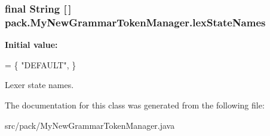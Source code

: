\subsubsection[{\texorpdfstring{lex\+State\+Names}{lexStateNames}}]{\setlength{\rightskip}{0pt plus 5cm}final String \mbox{[}$\,$\mbox{]} pack.\+My\+New\+Grammar\+Token\+Manager.\+lex\+State\+Names\hspace{0.3cm}{\ttfamily [static]}}\hypertarget{classpack_1_1_my_new_grammar_token_manager_a46273aab1da1108eab37e3c575573615}{}\label{classpack_1_1_my_new_grammar_token_manager_a46273aab1da1108eab37e3c575573615}
{\bfseries Initial value\+:}
\begin{DoxyCode}
= \{
   \textcolor{stringliteral}{"DEFAULT"},
\}
\end{DoxyCode}
Lexer state names. 

The documentation for this class was generated from the following file\+:\begin{DoxyCompactItemize}
\item 
src/pack/My\+New\+Grammar\+Token\+Manager.\+java\end{DoxyCompactItemize}
